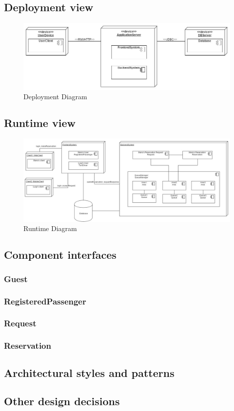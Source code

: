 	\newpage
	\begin{landscape}
	\subsection{Deployment view}
		\begin{figure}[h!]
			\begin{center}
				\includegraphics[width=0.9\linewidth]{../SE2_IMAGES/DeploymentDiagram}
				\caption{Deployment Diagram}
			\end{center}
		\end{figure}
	\end{landscape}
	\newpage
	\begin{landscape}
	\subsection{Runtime view}
		\begin{figure}[h!]
			\begin{center}
				\includegraphics[width=0.9\linewidth]{../SE2_IMAGES/RuntimeDiagram}
				\caption{Runtime Diagram}
			\end{center}
		\end{figure}
	\end{landscape}
	\newpage
	\subsection{Component interfaces}
		\subsubsection{Guest}
		\subsubsection{RegisteredPassenger}
		\subsubsection{Request}
		\subsubsection{Reservation}
	\subsection{Architectural styles and patterns}
	\subsection{Other design decisions}